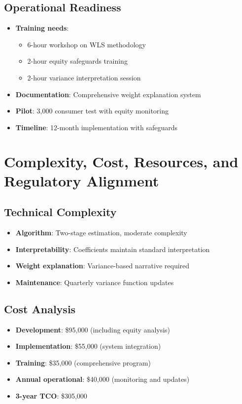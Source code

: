\subsection{Operational Readiness}

\begin{itemize}
    \item \textbf{Training needs}:
    \begin{itemize}
        \item 6-hour workshop on WLS methodology
        \item 2-hour equity safeguards training
        \item 2-hour variance interpretation session
    \end{itemize}
    \item \textbf{Documentation}: Comprehensive weight explanation system
    \item \textbf{Pilot}: 3,000 consumer test with equity monitoring
    \item \textbf{Timeline}: 12-month implementation with safeguards
\end{itemize}

\section{Complexity, Cost, Resources, and Regulatory Alignment}

\subsection{Technical Complexity}

\begin{itemize}
    \item \textbf{Algorithm}: Two-stage estimation, moderate complexity
    \item \textbf{Interpretability}: Coefficients maintain standard interpretation
    \item \textbf{Weight explanation}: Variance-based narrative required
    \item \textbf{Maintenance}: Quarterly variance function updates
\end{itemize}

\subsection{Cost Analysis}

\begin{itemize}
    \item \textbf{Development}: \$95,000 (including equity analysis)
    \item \textbf{Implementation}: \$55,000 (system integration)
    \item \textbf{Training}: \$35,000 (comprehensive program)
    \item \textbf{Annual operational}: \$40,000 (monitoring and updates)
    \item \textbf{3-year TCO}: \$305,000
\end{itemize}

